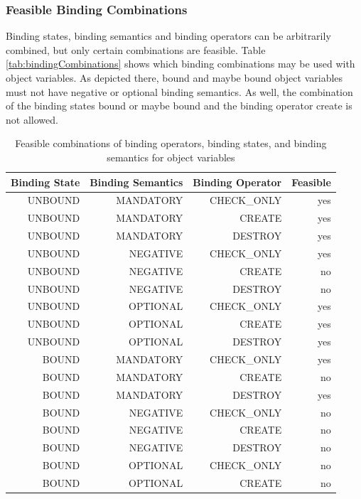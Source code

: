 \subsubsection{Feasible Binding Combinations}

Binding states, binding semantics and binding operators can be
arbitrarily combined, but only certain combinations are feasible. 
Table \ref{tab:bindingCombinations} shows which binding combinations may be
used with object variables.
As depicted there, bound and maybe bound object variables must not have negative
or optional binding semantics. As well, the combination of the binding states
bound or maybe bound and the binding operator create is not allowed.

\begin{table}[htbp]
  \centering
  \caption{Feasible combinations of binding operators, binding states, and
  binding semantics for object variables}
    \begin{tabular}{|r|r|r|r|}
    \hline
    \textbf{Binding State} & \textbf{Binding Semantics} & \textbf{Binding
    Operator} & \textbf{Feasible} \\
    \hline
    UNBOUND & MANDATORY & CHECK\_ONLY & yes \\
    UNBOUND & MANDATORY & CREATE & yes \\
    UNBOUND & MANDATORY & DESTROY & yes \\
    UNBOUND & NEGATIVE & CHECK\_ONLY & yes \\
    UNBOUND & NEGATIVE & CREATE & no \\
    UNBOUND & NEGATIVE & DESTROY & no \\
    UNBOUND & OPTIONAL & CHECK\_ONLY & yes \\
    UNBOUND & OPTIONAL & CREATE & yes \\
    UNBOUND & OPTIONAL & DESTROY & yes \\
    \hline
    BOUND & MANDATORY & CHECK\_ONLY & yes \\
    BOUND & MANDATORY & CREATE & no \\
    BOUND & MANDATORY & DESTROY & yes \\
    BOUND & NEGATIVE & CHECK\_ONLY & no \\
    BOUND & NEGATIVE & CREATE & no \\
    BOUND & NEGATIVE & DESTROY & no \\
    BOUND & OPTIONAL & CHECK\_ONLY & no \\
    BOUND & OPTIONAL & CREATE & no \\

\end{tabular}
\end{table}
